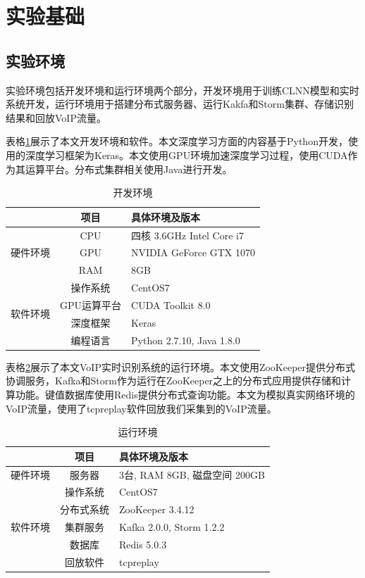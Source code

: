 \section{实验基础}
\subsection{实验环境}
实验环境包括开发环境和运行环境两个部分，开发环境用于训练CLNN模型和实时系统开发，运行环境用于搭建分布式服务器、运行Kakfa和Storm集群、存储识别结果和回放VoIP流量。

表格\ref{tab:dev}展示了本文开发环境和软件。本文深度学习方面的内容基于Python开发，使用的深度学习框架为Keras。本文使用GPU环境加速深度学习过程，使用CUDA作为其运算平台。分布式集群相关使用Java进行开发。
\begin{table} [htb]
\caption{开发环境}\label{tab:dev}
\small
\centering
{
\begin{tabular}{ccl}
  \toprule
          &   \textbf{项目} &   \textbf{具体环境及版本}\\
  \midrule
       \multirow{3}{*}{硬件环境}  & CPU &   四核 3.6GHz Intel Core i7 \\
                 &    GPU    &  NVIDIA GeForce GTX 1070  \\
                 &    RAM    &  8GB  \\ 
  \midrule
       \multirow{4}{*}{软件环境} & 操作系统 & CentOS7  \\ 
                 & GPU运算平台 & CUDA Toolkit 8.0\\
                 &    深度框架 & Keras \\
                 &   编程语言 & Python 2.7.10, Java 1.8.0\\
 \bottomrule
\end{tabular}
}
\end{table}

表格\ref{tab:runtime}展示了本文VoIP实时识别系统的运行环境。本文使用ZooKeeper提供分布式协调服务，Kafka和Storm作为运行在ZooKeeper之上的分布式应用提供存储和计算功能。键值数据库使用Redis提供分布式查询功能。本文为模拟真实网络环境的VoIP流量，使用了tcpreplay软件回放我们采集到的VoIP流量。
\begin{table} [htb]
\caption{运行环境}\label{tab:runtime}
\small
\centering
{
\begin{tabular}{ccl}
  \toprule
          &   \textbf{项目} &   \textbf{具体环境及版本}\\
  \midrule
       \multirow{1}{*}{硬件环境}  & 服务器 &  3台, RAM 8GB, 磁盘空间 200GB  \\
  \midrule
       \multirow{5}{*}{软件环境} & 操作系统 & CentOS7  \\ 
                 &    分布式系统 & ZooKeeper 3.4.12 \\
                 & 集群服务 &Kafka 2.0.0, Storm 1.2.2\\
                 &    数据库 & Redis 5.0.3 \\
                 &   回放软件 & tcpreplay\\
 \bottomrule
\end{tabular}
}
\end{table}


